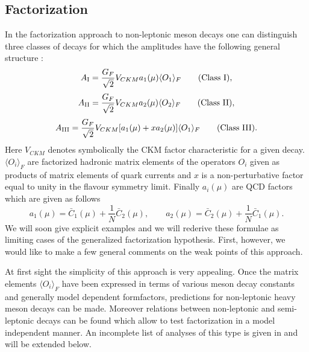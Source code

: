 \subsection{Factorization}
In the factorization approach to non-leptonic meson decays
\cite{FEYNMAN,STECHF} one can
distinguish three classes of decays for which the amplitudes have the
following general structure \cite{BAUER,NEUBERT}:
\begin{equation}\label{1}
A_{\rm I}=\frac{G_F}{\sqrt{2}} V_{CKM}a_1(\mu)\langle O_1\rangle_F 
\qquad {\rm (Class~I)},
\end{equation}
\begin{equation}\label{2}
A_{\rm II}=\frac{G_F}{\sqrt{2}} V_{CKM}a_2(\mu)\langle O_2\rangle_F 
\qquad {\rm (Class~II)},
\end{equation}
\begin{equation}\label{3N}
A_{\rm III}=
\frac{G_F}{\sqrt{2}} V_{CKM}[a_1(\mu)+x a_2(\mu)]\langle O_1\rangle_F
 \qquad {\rm (Class~III)}.
\end{equation}
Here $V_{CKM}$ denotes symbolically the CKM factor characteristic for a
given decay. 
$\langle O_i\rangle_F$ are factorized 
hadronic matrix
elements of the operators $O_i$ given as products of matrix elements of
quark currents and $x$ is a non-perturbative factor equal to unity in
the flavour symmetry limit. Finally $a_i(\mu)$ are QCD factors which
are given as follows
\begin{equation}\label{BS23}
a_1(\mu)=\bar C_1(\mu)+\frac{1}{N} \bar C_2(\mu), \qquad
a_2(\mu)=\bar C_2(\mu)+\frac{1}{N} \bar C_1(\mu).
\end{equation}
We will soon give explicit examples and we will rederive these
formulae as limiting cases of the generalized factorization 
hypothesis. First, however, we would like to make a few general
comments on the weak points of this approach.

At first sight the simplicity of this approach is very appealing.
Once the matrix elements $\langle O_i\rangle_F $
have been expressed in terms of various meson
decay constants and generally model dependent formfactors, predictions
for non-leptonic heavy meson decays can be made. 
Moreover relations between non-leptonic and semi-leptonic decays can
be found which allow to test factorization in a model independent
manner. An incomplete list of analyses of this type is given in 
\cite{LNF,NEUBERT} and will be extended below.
 
